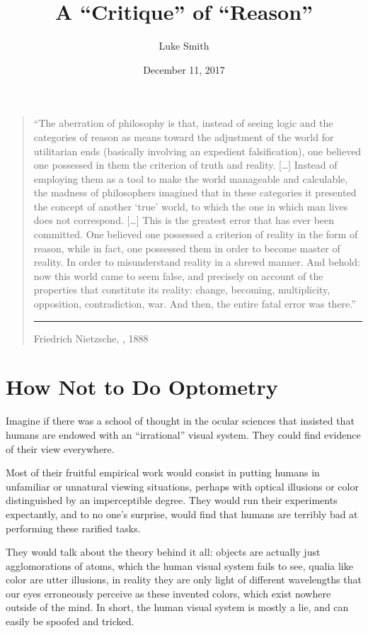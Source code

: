\documentclass{article}
\title{A ``Critique'' of ``Reason''}
\author{Luke Smith}
\date{December 11, 2017}
\begin{document}
\maketitle

\begin{quote}
``The aberration of philosophy is that, instead of seeing logic and the categories of reason as means toward the adjustment of the world for utilitarian ends (basically involving an expedient falsification), one believed one possessed in them the criterion of truth and reality.
	[\ldots]
Instead of employing them as a tool to make the world manageable and calculable, the madness of philosophers imagined that in these categories it presented the concept of another `true' world, to which the one in which man lives does not correspond.
	[\ldots]
This is the greatest error that has ever been committed.
One believed one possessed a criterion of reality in the form of reason, while in fact, one possessed them in order to become master of reality.
In order to misunderstand reality in a shrewd manner.
And behold: now this world came to seem false, and precisely on account of the properties that constitute its reality: change, becoming, multiplicity, opposition, contradiction, war.
And then, the entire fatal error was there.''
	\vspace{.25cm}\hrule
	\hfill Friedrich Nietzsche, , 1888
\end{quote}

\onehalfspacing

\section{How Not to Do Optometry}

Imagine if there was a school of thought in the ocular sciences that insisted that humans are endowed with an ``irrational'' visual system.
They could find evidence of their view everywhere.

Most of their fruitful empirical work would consist in putting humans in unfamiliar or unnatural viewing situations, perhaps with optical illusions or color distinguished by an imperceptible degree.
They would run their experiments expectantly, and to no one's surprise, would find that humans are terribly bad at performing these rarified tasks.

They would talk about the theory behind it all: objects are actually just agglomorations of atoms, which the human visual system fails to see, qualia like color are utter illusions, in reality they are only light of different wavelengths that our eyes erroneously perceive as these invented colors, which exist nowhere outside of the mind.
In short, the human visual system is mostly a lie, and can easily be spoofed and tricked.
\end{document}
